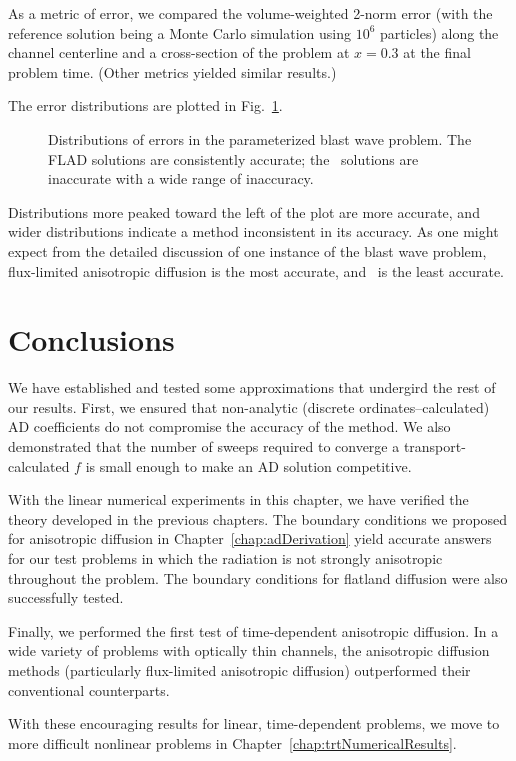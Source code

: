 As a metric of error, we compared the volume-weighted
2-norm error (with the reference solution being a Monte Carlo simulation
using $10^6$ particles) along the channel centerline and a cross-section of the
problem at $x=0.3$ at the final problem time. (Other metrics yielded similar
results.)

The error distributions are plotted in Fig.~\ref{fig:tdBlastwaveParameterized}.
%
\begin{figure}[htb]
  \centering\small

  \caption{Distributions of errors in the parameterized blast wave problem. The
  FLAD solutions are consistently accurate; the \Pone\ solutions are inaccurate
  with a wide range of inaccuracy.}
  \label{fig:tdBlastwaveParameterized}
\end{figure}
%
Distributions more peaked toward the left of the plot are more accurate, and
wider distributions indicate a method inconsistent in its accuracy. As one might
expect from the detailed discussion of one instance of the blast wave problem,
flux-limited anisotropic diffusion is the most accurate, and \Pone\ is the least
accurate.

\section{Conclusions}

We have established and tested some approximations that undergird the rest of
our results.  First, we ensured that non-analytic (discrete
ordinates--calculated) AD coefficients do not compromise the accuracy of the
method. We also demonstrated that the number of sweeps required to converge a
transport-calculated $f$ is small enough to make an AD solution competitive.

With the linear numerical experiments in this chapter, we have verified the
theory developed in the previous chapters. The boundary conditions we proposed
for anisotropic diffusion in Chapter~\ref{chap:adDerivation} yield accurate
answers for our test problems in which the radiation is not strongly anisotropic
throughout the problem. The boundary conditions for flatland diffusion were also
successfully tested.

Finally, we performed the first test of time-dependent anisotropic diffusion. In
a wide variety of problems with optically thin channels, the anisotropic
diffusion methods (particularly flux-limited anisotropic diffusion) outperformed
their conventional counterparts.

With these encouraging results for linear, time-dependent problems, we move to
more difficult nonlinear problems in Chapter~\ref{chap:trtNumericalResults}.

